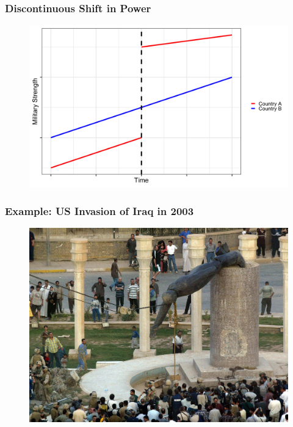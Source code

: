 \documentclass{beamer}
\begin{document}
\begin{frame} 
	\frametitle{\LARGE{Discontinuous Shift in Power}}
	\begin{figure}[ht!]
		\centering
		\includegraphics[height=.85\textheight, keepaspectratio]{./disc_jump.png}
	\end{figure}
\end{frame}

\begin{frame} 
	\frametitle{\LARGE{Example: US Invasion of Iraq in 2003}}
	\begin{figure}[ht!]
		\centering
		\includegraphics[height=.9\textheight, keepaspectratio]{Saddamstatue.jpg}
	\end{figure}
\end{frame}
\end{document}
